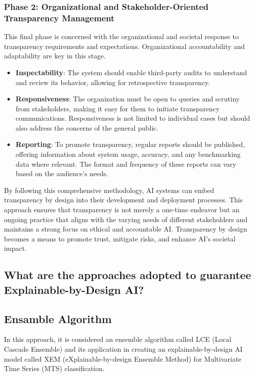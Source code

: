 \documentclass{article}
\begin{document}
\subsubsection{Phase 2: Organizational and Stakeholder-Oriented Transparency Management}

This final phase is concerned with the organizational and societal response to transparency requirements and expectations. Organizational accountability and adaptability are key in this stage.

\begin{itemize}
    \item \textbf{Inspectability}: The system should enable third-party audits to understand and review its behavior, allowing for retrospective transparency.
    
    \item \textbf{Responsiveness}: The organization must be open to queries and scrutiny from stakeholders, making it easy for them to initiate transparency communications. Responsiveness is not limited to individual cases but should also address the concerns of the general public.
    
    \item \textbf{Reporting}: To promote transparency, regular reports should be published, offering information about system usage, accuracy, and any benchmarking data where relevant. The format and frequency of these reports can vary based on the audience's needs.
\end{itemize}

By following this comprehensive methodology, AI systems can embed transparency by design into their development and deployment processes. This approach ensures that transparency is not merely a one-time endeavor but an ongoing practice that aligns with the varying needs of different stakeholders and maintains a strong focus on ethical and accountable AI. Transparency by design becomes a means to promote trust, mitigate risks, and enhance AI's societal impact.

\newpage
\subsection{What are the approaches adopted to guarantee Explainable-by-Design AI?}
\subsection{Ensamble Algorithm}
In this approach, it is considered an ensemble algorithm called LCE (Local Cascade Ensemble) and its application in creating an explainable-by-design AI model called XEM (eXplainable-by-design Ensemble Method) for Multivariate Time Series (MTS) classification.
\end{document}
